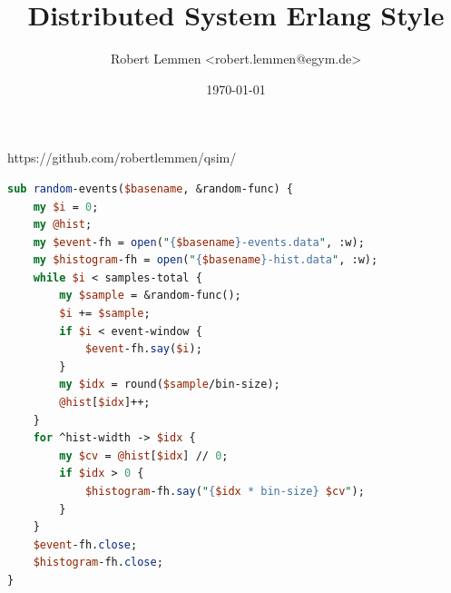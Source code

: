 \documentclass[12pt,a4paper,aspectratio=169]{beamer}
\title{Distributed System Erlang Style}
\author{Robert Lemmen \textless robert.lemmen@egym.de\textgreater}
\date{\today}
\begin{document}
 {

\frame {
    \titlepage
}




\begin{frame}[fragile] 
{\color{blue}https://github.com/robertlemmen/qsim/}
\begin{lstlisting}[language=Perl,basicstyle=\footnotesize]
sub random-events($basename, &random-func) {
    my $i = 0;
    my @hist;
    my $event-fh = open("{$basename}-events.data", :w);
    my $histogram-fh = open("{$basename}-hist.data", :w);
    while $i < samples-total {
        my $sample = &random-func();
        $i += $sample;
        if $i < event-window {
            $event-fh.say($i);
        }
        my $idx = round($sample/bin-size); 
        @hist[$idx]++;
    }
    for ^hist-width -> $idx {
        my $cv = @hist[$idx] // 0;
        if $idx > 0 {
            $histogram-fh.say("{$idx * bin-size} $cv");
        }
    }
    $event-fh.close;
    $histogram-fh.close;
}
\end{lstlisting}
\end{frame}

}
\end{document}
